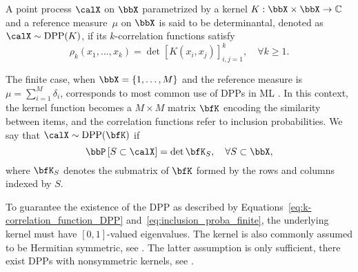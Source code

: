 \documentclass[twoside,11pt]{article}
\begin{document}
    
    

\noindent
   A point process $\calX$ on $\bbX$ parametrized by a kernel $K:\bbX\times \bbX\rightarrow \mathbb{C}$ and a reference measure~$\mu$ on $\bbX$ is said to be determinantal, denoted as $\calX\sim\DPP(K)$, if its $k$-correlation functions satisfy
    \begin{equation}
    \label{eq:k-correlation_function_DPP}
      \rho_k(x_1,\dots,x_k)
        = \det [K(x_i, x_j)]_{i,j=1}^k,
      \quad \forall k\geq 1.
    \end{equation}

 \noindent   The finite case, when $\bbX = \lrcb{1,\dots,M}$ and the reference measure is $\mu=\sum_{i=1}^M \delta_i$, corresponds to most common use of DPPs in ML \citep{KuTa12}.
    In this context, the kernel function becomes a $M\times M$ matrix $\bfK$ encoding the similarity between items, and the correlation functions refer to inclusion probabilities.
    We say that $\calX\sim \DPP(\bfK)$ if
    \begin{equation}
    \label{eq:inclusion_proba_finite}
      \Proba{S \subset \calX} = \det \bfK_S,
        \quad\forall S\subset \bbX,
    \end{equation}
\noindent
    where $\bfK_S$ denotes the submatrix of $\bfK$ formed by the rows and columns indexed by $S$.

    To guarantee the existence of the DPP as described by Equations~\ref{eq:k-correlation_function_DPP} and~\ref{eq:inclusion_proba_finite}, the underlying kernel must have $[0,1]$-valued eigenvalues. The kernel is also commonly assumed to be Hermitian symmetric, see \citet[Theorem 3]{Sos00}.
    The latter assumption is only sufficient, there exist DPPs with nonsymmetric kernels, see \citet{BoDiFu10}.
\end{document}
